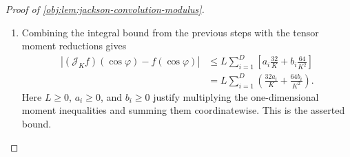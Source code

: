 \begin{proof}[Proof of \cref{obj:lem:jackson-convolution-modulus}]
\begin{enumerate}
\item Combining the integral bound from the previous steps with the tensor moment reductions gives
\[
\begin{aligned}
\left|(\mathcal J_K f)(\cos\varphi)-f(\cos\varphi)\right|
&\le
L\sum_{i=1}^D
\left[
a_i\frac{32}{K}
+
b_i\frac{64}{K^2}
\right]  \\
&=
L\sum_{i=1}^D
\left(\frac{32a_i}{K}+\frac{64b_i}{K^2}\right).
\end{aligned}
\]
Here \(L\ge0\), \(a_i\ge0\), and \(b_i\ge0\) justify multiplying the one-dimensional moment inequalities and summing them coordinatewise. This is the asserted bound. %
\end{enumerate}
\end{proof}
